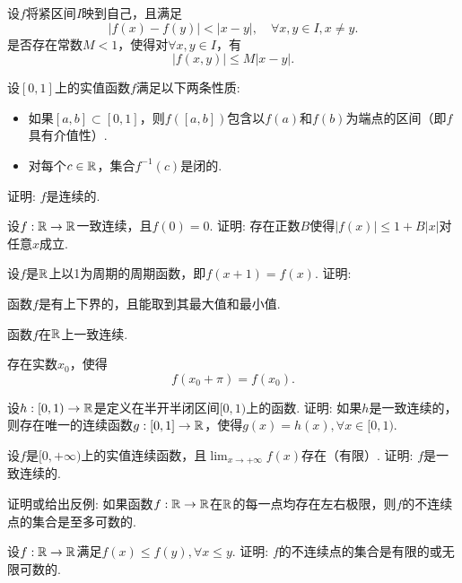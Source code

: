 \begin{example}
  设$f$将紧区间$I$映到自己，且满足
  \[ |f(x)-f(y)|<|x-y|,\quad \forall x,y\in I,x\ne y. \]
  是否存在常数$M<1$，使得对$\forall x,y\in I$，有
  \[ |f(x,y)| \le M|x-y|. \]
\end{example}

\begin{example}
  设$[0,1]$上的实值函数$f$满足以下两条性质:
  \begin{itemize}
    \item 如果$[a,b]\subset[0,1]$，则$f([a,b])$包含以$f(a)$和$f(b)$为端点的区间（即$f$具有介值性）.
    \item 对每个$c\in\mathbb R$，集合$f^{-1}(c)$是闭的.
  \end{itemize}
  证明: $f$是连续的.
\end{example}

\begin{example}
  设$f:\mathbb R\to\mathbb R$一致连续，且$f(0)=0$. 证明: 存在正数$B$使得$|f(x)|\le1+B|x|$对任意$x$成立.
\end{example}

\begin{example}
  设$f$是$\mathbb R$上以1为周期的周期函数，即$f(x+1)=f(x)$. 证明:
  \begin{eenum}
    \item 函数$f$是有上下界的，且能取到其最大值和最小值.
    \item 函数$f$在$\mathbb R$上一致连续.
    \item 存在实数$x_0$，使得
      \[ f(x_0+\pi) = f(x_0). \]
  \end{eenum}
\end{example}

\begin{example}
  设$h:[0,1)\to\mathbb R$是定义在半开半闭区间$[0,1)$上的函数. 证明: 如果$h$是一致连续的，则存在唯一的连续函数$g:[0,1]\to\mathbb R$，使得$g(x)=h(x),\forall x\in[0,1)$.
\end{example}

\begin{example}
  设$f$是$[0,+\infty)$上的实值连续函数，且$\lim_{x\to+\infty}f(x)$存在（有限）. 证明: $f$是一致连续的.
\end{example}

\begin{example}
  证明或给出反例: 如果函数$f:\mathbb R\to\mathbb R$在$\mathbb R$的每一点均存在左右极限，则$f$的不连续点的集合是至多可数的.
\end{example}

\begin{example}
  设$f:\mathbb R\to\mathbb R$满足$f(x)\le f(y),\forall x\le y$. 证明: $f$的不连续点的集合是有限的或无限可数的.
\end{example}

